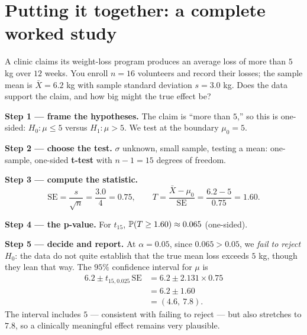 \section{Putting it together: a complete worked study}
\label{ch32:worked}

\begin{walkbox}
A clinic claims its weight-loss program produces an average loss of more than $5$ kg
over $12$ weeks. You enroll $n=16$ volunteers and record their losses; the sample mean
is $\bar X = 6.2$ kg with sample standard deviation $s = 3.0$ kg. Does the data support
the claim, and how big might the true effect be?
\end{walkbox}

\textbf{Step 1 --- frame the hypotheses.} The claim is ``more than $5$,'' so this is
one-sided: $H_0\!:\mu \le 5$ versus $H_1\!:\mu > 5$. We test at the boundary $\mu_0=5$.

\textbf{Step 2 --- choose the test.} $\sigma$ unknown, small sample, testing a mean:
one-sample, one-sided \textbf{t-test} with $n-1 = 15$ degrees of freedom.

\textbf{Step 3 --- compute the statistic.}
\[
  \mathrm{SE} = \frac{s}{\sqrt n} = \frac{3.0}{4} = 0.75,\qquad
  T = \frac{\bar X - \mu_0}{\mathrm{SE}} = \frac{6.2 - 5}{0.75} = 1.60.
\]

\textbf{Step 4 --- the p-value.} For $t_{15}$, $\P(T \ge 1.60) \approx 0.065$ (one-sided).

\textbf{Step 5 --- decide and report.} At $\alpha=0.05$, since $0.065 > 0.05$,
we \emph{fail to reject} $H_0$: the data do not quite establish that the true mean loss
exceeds $5$ kg, though they lean that way. The $95\%$ confidence interval for $\mu$ is
\begin{align*}
  6.2 \pm t_{15,0.025}\,\mathrm{SE} &= 6.2 \pm 2.131 \times 0.75 \\
  &= 6.2 \pm 1.60 \\
  &= (4.6,\ 7.8).
\end{align*}
The interval includes $5$ --- consistent with failing to reject --- but also stretches
to $7.8$, so a clinically meaningful effect remains very plausible.

